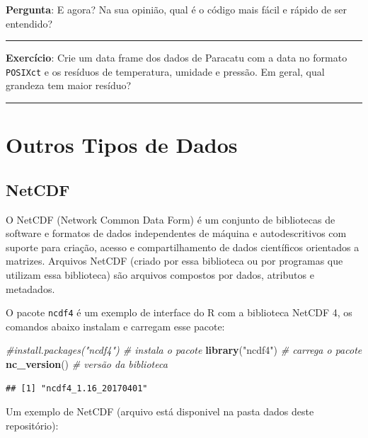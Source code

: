 \documentclass[]{book}
\newenvironment{Shaded}{\begin{snugshade}}{\end{snugshade}}
\newcommand{\KeywordTok}[1]{\textcolor[rgb]{0.13,0.29,0.53}{\textbf{#1}}}
\newcommand{\StringTok}[1]{\textcolor[rgb]{0.31,0.60,0.02}{#1}}
\newcommand{\CommentTok}[1]{\textcolor[rgb]{0.56,0.35,0.01}{\textit{#1}}}
\newcommand{\NormalTok}[1]{#1}
\theoremstyle{definition}
\theoremstyle{definition}
\theoremstyle{definition}
\theoremstyle{remark}
\begin{document}
{\textbf{Pergunta}: E agora? Na sua opinião, qual é o código mais fácil
e rápido de ser entendido?}

\begin{center}\rule{0.5\linewidth}{\linethickness}\end{center}

{\textbf{Exercício}: Crie um data frame dos dados de Paracatu com a data
no formato \texttt{POSIXct} e os resíduos de temperatura, umidade e
pressão. Em geral, qual grandeza tem maior resíduo?}

\begin{center}\rule{0.5\linewidth}{\linethickness}\end{center}

\section{Outros Tipos de Dados}\label{outros-tipos-de-dados}

\subsection{NetCDF}\label{netcdf}

O NetCDF (Network Common Data Form) é um conjunto de bibliotecas de
software e formatos de dados independentes de máquina e autodescritivos
com suporte para criação, acesso e compartilhamento de dados científicos
orientados a matrizes. Arquivos NetCDF (criado por essa biblioteca ou
por programas que utilizam essa biblioteca) são arquivos compostos por
dados, atributos e metadados.

O pacote \texttt{ncdf4} é um exemplo de interface do R com a biblioteca
NetCDF 4, os comandos abaixo instalam e carregam esse pacote:

\begin{Shaded}
\begin{Highlighting}[]
\CommentTok{#install.packages("ncdf4") # instala o pacote}
\KeywordTok{library}\NormalTok{(}\StringTok{"ncdf4"}\NormalTok{)           }\CommentTok{# carrega o pacote}
\KeywordTok{nc_version}\NormalTok{()               }\CommentTok{# versão da biblioteca}
\end{Highlighting}
\end{Shaded}

\begin{verbatim}
## [1] "ncdf4_1.16_20170401"
\end{verbatim}

Um exemplo de NetCDF (arquivo está disponivel na pasta dados deste
repositório):
\end{document}
